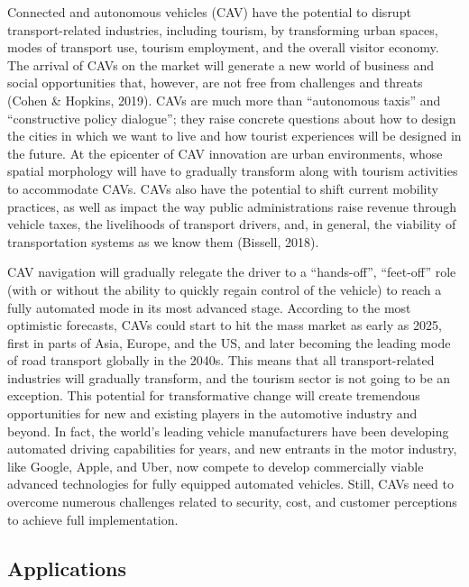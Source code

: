 \documentclass[
  letterpaper,
  DIV=11,
  numbers=noendperiod]{scrreprt}
\begin{document}
Connected and autonomous vehicles (CAV) have the potential to disrupt
transport-related industries, including tourism, by transforming urban
spaces, modes of transport use, tourism employment, and the overall
visitor economy. The arrival of CAVs on the market will generate a new
world of business and social opportunities that, however, are not free
from challenges and threats (Cohen \& Hopkins, 2019). CAVs are much more
than ``autonomous taxis'' and ``constructive policy dialogue''; they
raise concrete questions about how to design the cities in which we want
to live and how tourist experiences will be designed in the future. At
the epicenter of CAV innovation are urban environments, whose spatial
morphology will have to gradually transform along with tourism
activities to accommodate CAVs. CAVs also have the potential to shift
current mobility practices, as well as impact the way public
administrations raise revenue through vehicle taxes, the livelihoods of
transport drivers, and, in general, the viability of transportation
systems as we know them (Bissell, 2018).

CAV navigation will gradually relegate the driver to a ``hands-off'',
``feet-off'' role (with or without the ability to quickly regain control
of the vehicle) to reach a fully automated mode in its most advanced
stage. According to the most optimistic forecasts, CAVs could start to
hit the mass market as early as 2025, first in parts of Asia, Europe,
and the US, and later becoming the leading mode of road transport
globally in the 2040s. This means that all transport-related industries
will gradually transform, and the tourism sector is not going to be an
exception. This potential for transformative change will create
tremendous opportunities for new and existing players in the automotive
industry and beyond. In fact, the world's leading vehicle manufacturers
have been developing automated driving capabilities for years, and new
entrants in the motor industry, like Google, Apple, and Uber, now
compete to develop commercially viable advanced technologies for fully
equipped automated vehicles. Still, CAVs need to overcome numerous
challenges related to security, cost, and customer perceptions to
achieve full implementation.

\hypertarget{applications-4}{%
\subsection{Applications}\label{applications-4}}
\end{document}
